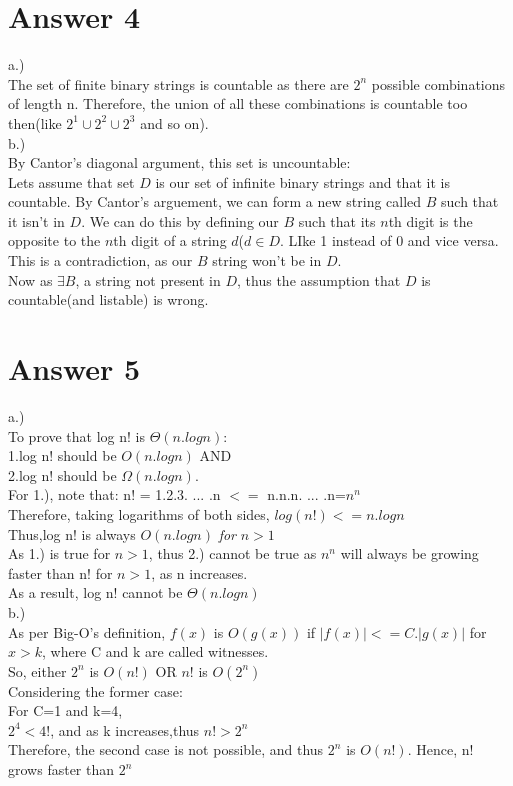 \documentclass[11pt]{article}
\begin{document}
\section*{Answer 4}
a.)\\
The set of finite binary strings is countable as there are $2^n$ possible combinations of length n. Therefore, the union of all these combinations is countable too then(like $2^1 \cup 2^2 \cup 2^3$ and so on).\\
b.)\\
By Cantor's diagonal argument, this set is uncountable:\\
Lets assume that set $D$ is our set of infinite binary strings and that it is countable. By Cantor's arguement, we can form a new string called $B$ such that it isn't in $D$. We can do this by defining our $B$ such that its $n$th digit is the opposite to the $n$th digit of a string $d$($d \in D$. LIke 1 instead of 0 and vice versa. This is a contradiction, as our $B$ string won't be in $D$.\\
Now as $\exists B$, a string not present in $D$, thus the assumption that $D$ is countable(and listable) is wrong.\\



\section*{Answer 5}
a.)\\
To prove that log n! is $\Theta(n.log n):$\\
1.log n! should be $O(n.log n)$ AND\\
2.log n! should be $\Omega(n.log n).$\\
For 1.), note that: n! = 1.2.3. ... .n $<=$ n.n.n. ... .n=$n^n$\\
Therefore, taking logarithms of both sides, $log (n!) <= n.log n$\\
Thus,log n! is always $O(n.log n)$ \textit{for} $ n >1$\\
As 1.) is true for $n>1$, thus 2.) cannot be true as $n^n$ will always be growing faster than n! for $n>1$, as n increases.\\
As a result, log n! cannot be $\Theta (n.log n)$\\
b.)\\
As per Big-O's definition, $f(x)$ is $O(g(x))$ if $|f(x)| <= C.|g(x)|$ for $x>k$, where C and k are called witnesses.\\
So, either $2^n$ is $O(n!)$ OR $n!$ is $O(2^n)$\\
Considering the former case:\\
For C=1 and k=4,\\
$2^4 < 4!$, and as k increases,thus $n! > 2^n$\\
Therefore, the second case is not possible, and thus $2^n$ is $O(n!)$. Hence, n! grows faster than $2^n$\\
\end{document}
